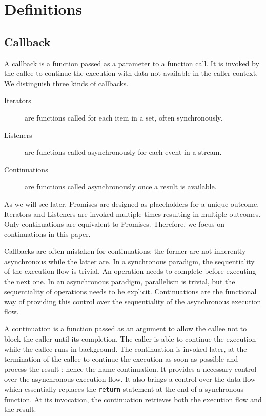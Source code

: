 \section{Definitions} \label{section:definitions}

\subsection{Callback} \label{section:definitions:continuation}

A callback is a function passed as a parameter to a function call.
It is invoked by the callee to continue the execution with data not available in the caller context.
We distinguish three kinds of callbacks.

\begin{description}
  \item[Iterators] are functions called for each item in a set, often synchronously.
  \item[Listeners] are functions called asynchronously for each event in a stream.
  \item[Continuations] are functions called asynchronously once a result is available.
\end{description}

As we will see later, Promises are designed as placeholders for a unique outcome.
Iterators and Listeners are invoked multiple times resulting in multiple outcomes.
Only continuations are equivalent to Promises.
Therefore, we focus on continuations in this paper.

Callbacks are often mistaken for continuations; the former are not inherently asynchronous while the latter are.
In a synchronous paradigm, the sequentiality of the execution flow is trivial.
An operation needs to complete before executing the next one.
In an asynchronous paradigm, parallelism is trivial, but the sequentiality of operations needs to be explicit.
Continuations are the functional way of providing this control over the sequentiality of the asynchronous execution flow.

A continuation is a function passed as an argument to allow the callee not to block the caller until its completion.
The caller is able to continue the execution while the callee runs in background.
The continuation is invoked later, at the termination of the callee to continue the execution as soon as possible and process the result ; hence the name continuation.
It provides a necessary control over the asynchronous execution flow.
It also brings a control over the data flow which essentially replaces the \texttt{return} statement at the end of a synchronous function.
At its invocation, the continuation retrieves both the execution flow and the result.

